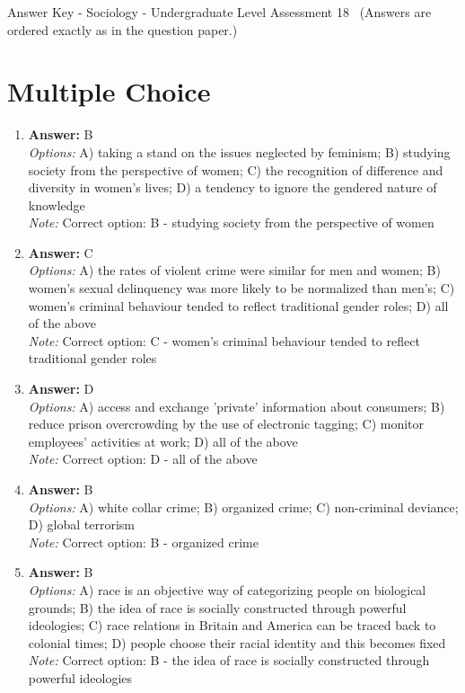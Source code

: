 \documentclass[12pt]{article}
\begin{document}
\begin{center}
Answer Key - Sociology - Undergraduate Level Assessment 18 \
\small (Answers are ordered exactly as in the question paper.)
\end{center}

\section*{Multiple Choice}
\begin{enumerate}[label=\arabic*.]
\item \textbf{Answer:} B
\\ \textit{Options:} A) taking a stand on the issues neglected by feminism; B) studying society from the perspective of women; C) the recognition of difference and diversity in women's lives; D) a tendency to ignore the gendered nature of knowledge
\\ \textit{Note:} Correct option: B - studying society from the perspective of women
\item \textbf{Answer:} C
\\ \textit{Options:} A) the rates of violent crime were similar for men and women; B) women's sexual delinquency was more likely to be normalized than men's; C) women's criminal behaviour tended to reflect traditional gender roles; D) all of the above
\\ \textit{Note:} Correct option: C - women's criminal behaviour tended to reflect traditional gender roles
\item \textbf{Answer:} D
\\ \textit{Options:} A) access and exchange 'private' information about consumers; B) reduce prison overcrowding by the use of electronic tagging; C) monitor employees' activities at work; D) all of the above
\\ \textit{Note:} Correct option: D - all of the above
\item \textbf{Answer:} B
\\ \textit{Options:} A) white collar crime; B) organized crime; C) non-criminal deviance; D) global terrorism
\\ \textit{Note:} Correct option: B - organized crime
\item \textbf{Answer:} B
\\ \textit{Options:} A) race is an objective way of categorizing people on biological grounds; B) the idea of race is socially constructed through powerful ideologies; C) race relations in Britain and America can be traced back to colonial times; D) people choose their racial identity and this becomes fixed
\\ \textit{Note:} Correct option: B - the idea of race is socially constructed through powerful ideologies
\end{enumerate}
\end{document}
